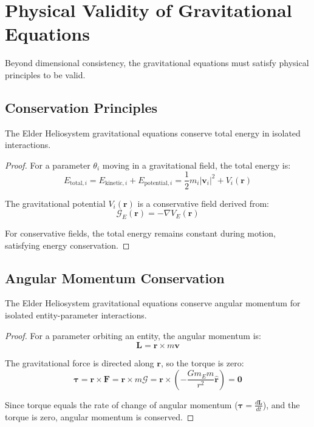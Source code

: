 \section{Physical Validity of Gravitational Equations}

Beyond dimensional consistency, the gravitational equations must satisfy physical principles to be valid.

\subsection{Conservation Principles}

\begin{theorem}
The Elder Heliosystem gravitational equations conserve total energy in isolated interactions.
\end{theorem}

\begin{proof}
For a parameter $\theta_i$ moving in a gravitational field, the total energy is:
\begin{equation}
E_{\text{total},i} = E_{\text{kinetic},i} + E_{\text{potential},i} = \frac{1}{2}m_i|\mathbf{v}_i|^2 + V_i(\mathbf{r})
\end{equation}

The gravitational potential $V_i(\mathbf{r})$ is a conservative field derived from:
\begin{equation}
\mathcal{G}_E(\mathbf{r}) = -\nabla V_E(\mathbf{r})
\end{equation}

For conservative fields, the total energy remains constant during motion, satisfying energy conservation.
\end{proof}

\subsection{Angular Momentum Conservation}

\begin{theorem}
The Elder Heliosystem gravitational equations conserve angular momentum for isolated entity-parameter interactions.
\end{theorem}

\begin{proof}
For a parameter orbiting an entity, the angular momentum is:
\begin{equation}
\mathbf{L} = \mathbf{r} \times m\mathbf{v}
\end{equation}

The gravitational force is directed along $\mathbf{r}$, so the torque is zero:
\begin{equation}
\boldsymbol{\tau} = \mathbf{r} \times \mathbf{F} = \mathbf{r} \times m\mathcal{G} = \mathbf{r} \times \left(-\frac{Gm_Em}{r^2}\hat{\mathbf{r}}\right) = \mathbf{0}
\end{equation}

Since torque equals the rate of change of angular momentum ($\boldsymbol{\tau} = \frac{d\mathbf{L}}{dt}$), and the torque is zero, angular momentum is conserved.
\end{proof}

